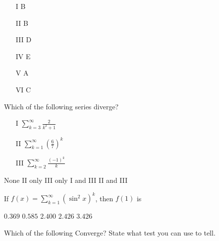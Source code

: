 \begin{questions}
    \begin{solution}
        \begin{enumerate}
        \item[I]   B
        \item[II]  B
        \item[III] D
        \item[IV]  E
        \item[V]   A
        \item[VI]  C
        \end{enumerate} 
    \end{solution}

\question[2] Which of the following series diverge?
            
    \begin{enumerate}
    \item[I] $\sum_{k = 3}^\infty \frac{2}{k^2 + 1}$
    \item[II] $\sum_{k = 1}^\infty (\frac{6}{7})^k$
    \item[III] $\sum_{k = 2}^\infty \frac{(-1)^k}{k}$
    \end{enumerate}

    \begin{oneparchoices}
    \CorrectChoice None
    \choice II only
    \choice III only
    \choice I and III
    \choice II and III
    \end{oneparchoices} 

\question[2] If $f(x) = \sum_{k = 1}^\infty (\sin^2 x)^k$, then $f(1)$ is

    \begin{oneparchoices}
    \choice $0.369$
    \choice $0.585$
    \choice $2.400$
    \CorrectChoice $2.426$
    \choice $3.426$
    \end{oneparchoices}

\question[6] Which of the following Converge? State what test you can
    use to tell.

\end{questions}
